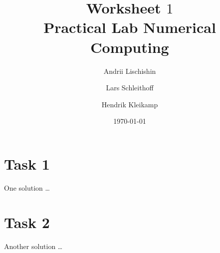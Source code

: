 \documentclass[10pt,a4paper]{article}
\begin{document}
\title{Worksheet $1$\\
\small{Practical Lab Numerical Computing}}
\author{Andrii Lischishin \and Lars Schleithoff \and Hendrik Kleikamp}
\date{\today}
\maketitle

\section*{Task 1}
One solution \ldots

\section*{Task 2}
Another solution \ldots
\end{document}
